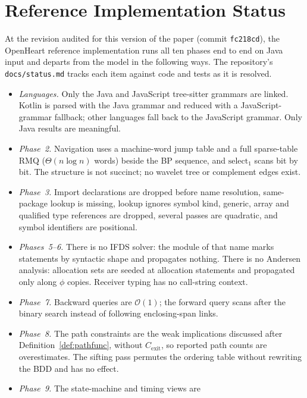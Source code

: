 \documentclass[journal,10pt,twoside]{IEEEtran}
\newcommand{\BigO}{\mathcal{O}}
\begin{document}
\section{Reference Implementation Status}\label{sec:impl}

At the revision audited for this version of the paper
(commit \texttt{fc218cd}), the OpenHeart reference
implementation runs all ten phases end to end on Java input
and departs from the model in the following ways.  The
repository's \texttt{docs/status.md} tracks each item against
code and tests as it is resolved.

\begin{itemize}
\item \emph{Languages.}  Only the Java and JavaScript
  tree-sitter grammars are linked.  Kotlin is parsed with the
  Java grammar and reduced with a JavaScript-grammar fallback;
  other languages fall back to the JavaScript grammar.  Only
  Java results are meaningful.
\item \emph{Phase~2.}  Navigation uses a machine-word jump
  table and a full sparse-table RMQ ($\Theta(n\log n)$ words)
  beside the BP sequence, and $\mathrm{select}_1$ scans bit by
  bit.  The structure is not succinct; no wavelet tree or
  complement edges exist.
\item \emph{Phase~3.}  Import declarations are dropped before
  name resolution, same-package lookup is missing, lookup
  ignores symbol kind, generic, array and qualified type
  references are dropped, several passes are quadratic, and
  symbol identifiers are positional.
\item \emph{Phases~5--6.}  There is no IFDS solver: the
  module of that name marks statements by syntactic shape and
  propagates nothing.  There is no Andersen analysis: allocation
  sets are seeded at allocation statements and propagated only
  along $\phi$ copies.  Receiver typing has no call-string
  context.
\item \emph{Phase~7.}  Backward queries are $\BigO(1)$; the
  forward query scans after the binary search instead of
  following enclosing-span links.
\item \emph{Phase~8.}  The path constraints are the weak
  implications discussed after Definition~\ref{def:pathfunc},
  without $C_{\mathrm{exit}}$, so reported path counts are
  overestimates.  The sifting pass permutes the ordering table
  without rewriting the BDD and has no effect.
\item \emph{Phase~9.}  The state-machine and timing views are

\end{itemize}
\end{document}
